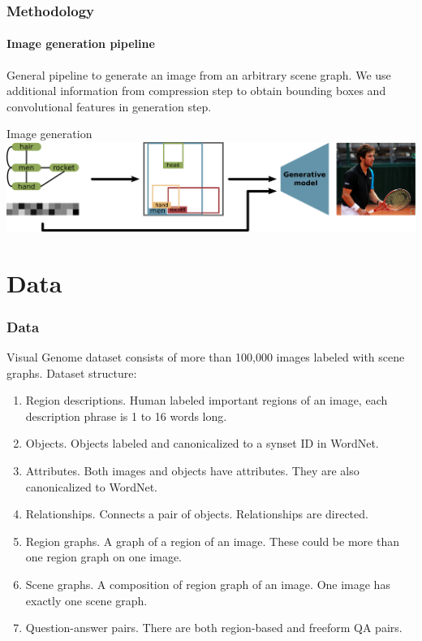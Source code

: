 \documentclass[10pt]{beamer}
\begin{document}
\begin{frame}
    \frametitle{Methodology}
    \framesubtitle{Image generation pipeline}
    General pipeline to generate an image from an arbitrary scene graph. We use additional information from compression step to obtain bounding boxes and convolutional features in generation step.
    \begin{block}{Image generation}
        \includegraphics[width=\textwidth]{figure/image-generation-from-sg.png}
    \end{block}
\end{frame}

\section{Data}
\begin{frame}
    \frametitle{Data}
    Visual Genome dataset consists of more than 100,000 images labeled with scene graphs.
    Dataset structure:
    \begin{enumerate}
        \item Region descriptions. Human labeled important regions of an image, each description phrase is 1 to 16 words long.
        \item Objects. Objects labeled and canonicalized to a synset ID in WordNet.
        \item Attributes. Both images and objects have attributes. They are also canonicalized to WordNet.
        \item Relationships. Connects a pair of objects. Relationships are directed.
        \item Region graphs. A graph of a region of an image. These could be more than one region graph on one image.
        \item Scene graphs. A composition of region graph of an image. One image has exactly one scene graph.
        \item Question-answer pairs. There are both region-based and freeform QA pairs.
    \end{enumerate}
\end{frame}
\end{document}
